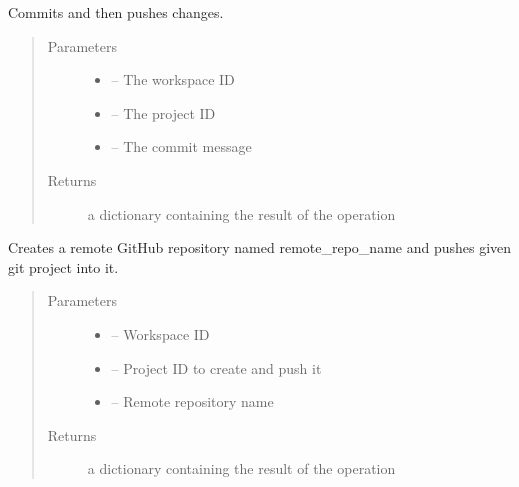 \documentclass[letterpaper,10pt,english]{sphinxmanual}
\begin{document}
\begin{fulllineitems}
\label{_source/son_editor.impl:son_editor.impl.gitimpl.commit_and_push}
Commits and then pushes changes.
\begin{quote}\begin{description}
\item[{Parameters}] \leavevmode\begin{itemize}
\item {} 
 -- The workspace ID

\item {} 
 -- The project ID

\item {} 
 -- The commit message

\end{itemize}

\item[{Returns}] \leavevmode
a dictionary containing the result of the operation

\end{description}\end{quote}

\end{fulllineitems}


\begin{fulllineitems}
\label{_source/son_editor.impl:son_editor.impl.gitimpl.create_commit_and_push}
Creates a remote GitHub repository named remote\_repo\_name and pushes given git project into it.
\begin{quote}\begin{description}
\item[{Parameters}] \leavevmode\begin{itemize}
\item {} 
 -- Workspace ID

\item {} 
 -- Project ID to create and push it

\item {} 
 -- Remote repository name

\end{itemize}

\item[{Returns}] \leavevmode
a dictionary containing the result of the operation

\end{description}\end{quote}

\end{fulllineitems}
\end{document}
